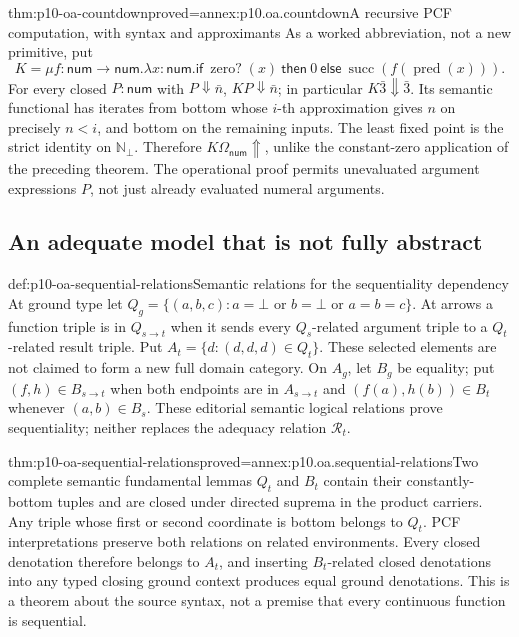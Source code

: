 \begin{hbtheorem}{thm:p10-oa-countdown}{proved=annex:p10.oa.countdown}{A recursive PCF computation, with syntax and approximants}
As a worked abbreviation, not a new primitive, put
\[
 K=\mu f:\mathsf{num}\to\mathsf{num}.
    \lambda x:\mathsf{num}.
    \mathsf{if}\ \operatorname{zero?}(x)\ \mathsf{then}\ 0\
    \mathsf{else}\ \operatorname{succ}(f(\operatorname{pred}(x))).
\]
For every closed \(P:\mathsf{num}\) with \(P\Downarrow\bar n\),
\(K P\Downarrow\bar n\); in particular \(K\bar3\Downarrow\bar3\).
Its semantic functional has iterates from bottom whose \(i\)-th
approximation gives \(n\) on precisely \(n<i\), and bottom on the
remaining inputs. The least fixed point is the strict identity on
\(\mathbb N_{\bot}\). Therefore \(K\Omega_{\mathsf{num}}\Uparrow\),
unlike the constant-zero application of the preceding theorem.
The operational proof permits unevaluated argument expressions \(P\),
not just already evaluated numeral arguments.
\end{hbtheorem}

\subsection{An adequate model that is not fully abstract}

\begin{hbdefinition}{def:p10-oa-sequential-relations}{Semantic relations for the sequentiality dependency}
At ground type let
\(Q_g=\{(a,b,c):a=\bot\text{ or }b=\bot\text{ or }a=b=c\}\).
At arrows a function triple is in \(Q_{s\to t}\) when it sends every
\(Q_s\)-related argument triple to a \(Q_t\)-related result triple.
Put \(A_t=\{d:(d,d,d)\in Q_t\}\). These selected elements are not
claimed to form a new full domain category. On \(A_g\), let \(B_g\)
be equality; put \((f,h)\in B_{s\to t}\) when both endpoints are
in \(A_{s\to t}\) and \((f(a),h(b))\in B_t\) whenever
\((a,b)\in B_s\). These editorial semantic logical relations prove
sequentiality; neither replaces the adequacy relation \(\mathcal R_t\).
\end{hbdefinition}

\begin{hbtheorem}{thm:p10-oa-sequential-relations}{proved=annex:p10.oa.sequential-relations}{Two complete semantic fundamental lemmas}
\(Q_t\) and \(B_t\) contain their constantly-bottom tuples and
are closed under directed suprema in the product carriers. Any triple
whose first or second coordinate is bottom belongs to \(Q_t\).
PCF interpretations preserve both relations on related environments.
Every closed denotation therefore belongs to \(A_t\), and inserting
\(B_t\)-related closed denotations into any typed closing ground context
produces equal ground denotations. This is a theorem about the source
syntax, not a premise that every continuous function is sequential.
\end{hbtheorem}

